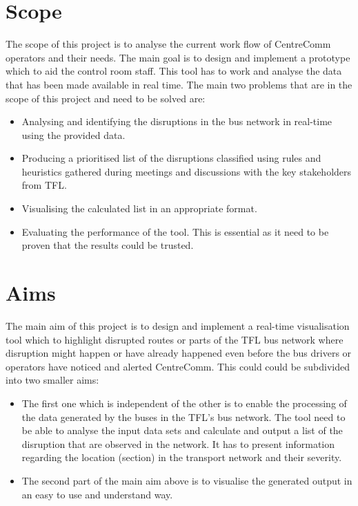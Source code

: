 \section{Scope}
The scope of this project is to analyse the current work flow of CentreComm operators and their needs. The main goal is to design and implement a prototype which to aid the control room staff. This tool has to work and analyse the data that has been made available in real time. The main two problems that are in the scope of this project and need to be solved are:
\begin{itemize}
	\item Analysing and identifying the disruptions in the bus network in real-time using the provided data.
	\item Producing a prioritised list of the disruptions classified using rules and heuristics gathered during meetings and discussions with the key stakeholders from TFL.
	\item Visualising the calculated list in an appropriate format.
	\item Evaluating the performance of the tool. This is essential as it need to be proven that the results could be trusted.
\end{itemize} 

\section{Aims}
The main aim of this project is to design and implement a real-time visualisation tool which to highlight disrupted routes or parts of the TFL bus network where disruption might happen or have already happened even before the bus drivers or operators have noticed and alerted CentreComm. This could could be subdivided into two smaller aims:
\begin{itemize}
	\item The first one which is independent of the other is to enable the processing of the data generated by the buses in the TFL's bus network. The tool need to be able to analyse the input data sets and calculate and output a list of the disruption that are observed in the network. It has to present information regarding the location (section) in the transport network and their severity.
	\item The second part of the main aim above is to visualise the generated output in an easy to use and understand way.
\end{itemize}

